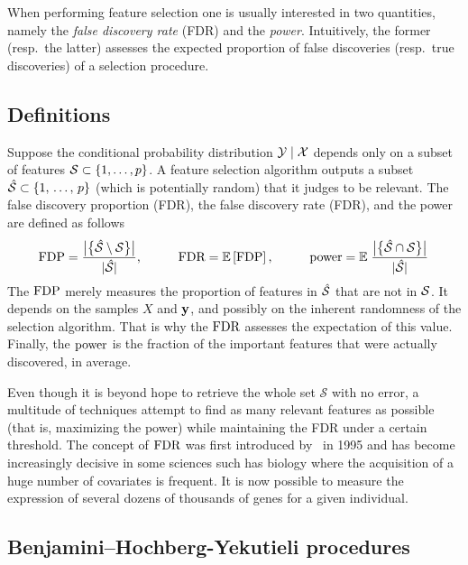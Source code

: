 When performing feature selection one is usually interested in two quantities,
namely the \emph{false discovery rate} (FDR) and the \emph{power}.
Intuitively, the former (resp.\ the latter) assesses the expected proportion of false discoveries
(resp.\ true discoveries) of a selection procedure.

\subsection{Definitions}\label{subsec:fdr_def}

Suppose the conditional probability distribution $\mathcal{Y} \mid \mathcal{X}$ depends only on a subset of features
$\mathcal{S} \subset \left\{ 1, \dots, p \right\}$.
A feature selection algorithm outputs a subset $\hat{\mathcal{S}} \subset \left\{ 1,\, \dots,\, p \right\}$ (which is potentially random)
that it judges to be relevant.
The false discovery proportion (FDR), the false discovery rate (FDR), and the power are defined as follows
\begin{equation}\label{eq:fdr_def}
    \text{FDP} = \frac
        {\big\lvert \big\{ \hat{\mathcal{S}} \setminus \mathcal{S} \big\} \big\rvert}
        {\lvert \hat{\mathcal{S}} \rvert}
    \text{,}\qquad\quad
    \text{FDR} = {\mathbb E}\left[\text{FDP}\right]
    \text{,}\qquad\quad
    \text{power} = {\mathbb E}\left.
        \frac
            {\big\lvert \big\{ \hat{\mathcal{S}} \cap \mathcal{S} \big\} \big\rvert}
            {\lvert\hat{\mathcal{S}}\rvert}
    \right.
\end{equation}
The $\text{FDP}$ merely measures the proportion of features in $\hat{\mathcal{S}}$ that are not in $\mathcal{S}$.
It depends on the samples $X$ and $\mathbf{y}$,
and possibly on the inherent randomness of the selection algorithm.
That is why the $\text{FDR}$ assesses the expectation of this value.
Finally, the $\text{power}$ is the fraction of the important features that were actually discovered, in average.

Even though it is beyond hope to retrieve the whole set $\mathcal{S}$ with no error,
a multitude of techniques attempt to find as many relevant features as possible
(that is, maximizing the power)
while maintaining the FDR under a certain threshold.
The concept of $\text{FDR}$ was first introduced by~\cite{bh} in 1995 and has become increasingly decisive in some
sciences such has biology where the acquisition of a huge number of covariates is frequent.
It is now possible to measure the expression of several dozens of thousands of genes for a given individual.

\subsection{Benjamini–Hochberg-Yekutieli procedures}\label{subsec:bhq}

